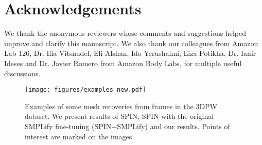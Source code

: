 \documentclass[runningheads]{llncs}
\begin{document}
\section*{Acknowledgements}

We thank the anonymous reviewers whose comments and suggestions helped improve and clarify this manuscript. We also thank our colleagues from Amazon Lab 126,  Dr. Ilia Vitsnudel, Eli Alshan, Ido Yerushalmi, Liza Potikha, Dr. Ianir Ideses and Dr. Javier Romero from Amazon Body Labs, for multiple useful discussions.     

\begin{figure}
	\texttt{[image: figures/examples\_new.pdf]}
	\centering
	\caption{Examples of some mesh recoveries from frames in the 3DPW dataset. We present results of SPIN, SPIN with the original SMPLify fine-tuning (SPIN+SMPLify) and our results. Points of interest are marked on the images.}
	\label{fig:examples}
\end{figure}



\end{document}
